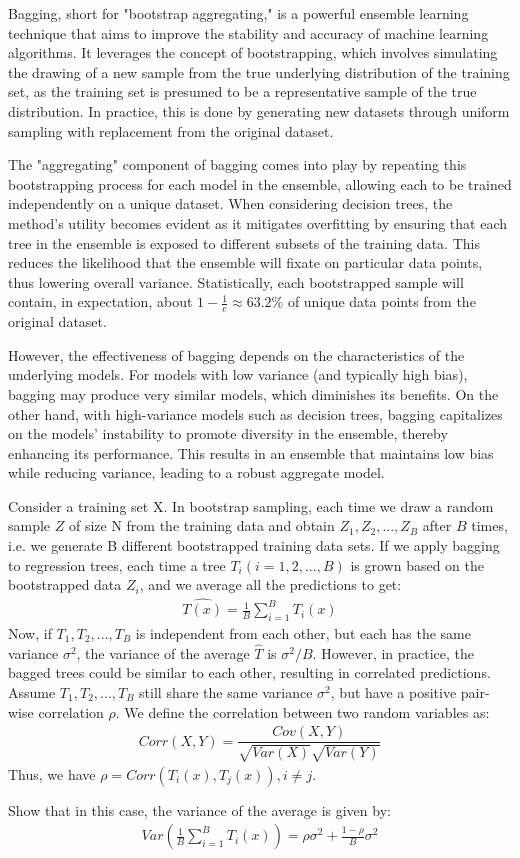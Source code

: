 \item {} 

Bagging, short for "bootstrap aggregating," is a powerful ensemble learning technique that aims to improve the stability and accuracy of machine learning algorithms. It leverages the concept of bootstrapping, which involves simulating the drawing of a new sample from the true underlying distribution of the training set, as the training set is presumed to be a representative sample of the true distribution. In practice, this is done by generating new datasets through uniform sampling with replacement from the original dataset.

The "aggregating" component of bagging comes into play by repeating this bootstrapping process for each model in the ensemble, allowing each to be trained independently on a unique dataset. When considering decision trees, the method's utility becomes evident as it mitigates overfitting by ensuring that each tree in the ensemble is exposed to different subsets of the training data. This reduces the likelihood that the ensemble will fixate on particular data points, thus lowering overall variance. Statistically, each bootstrapped sample will contain, in expectation, about $1 - \frac{1}{e} \approx 63.2\%$ of unique data points from the original dataset.

However, the effectiveness of bagging depends on the characteristics of the underlying models. For models with low variance (and typically high bias), bagging may produce very similar models, which diminishes its benefits. On the other hand, with high-variance models such as decision trees, bagging capitalizes on the models' instability to promote diversity in the ensemble, thereby enhancing its performance. This results in an ensemble that maintains low bias while reducing variance, leading to a robust aggregate model.

Consider a training set X. In bootstrap sampling, each time we draw a random sample $Z$ of size N from the training data and obtain ${Z_1, Z_2, ..., Z_B}$ after $B$ times, i.e. we generate B different bootstrapped training data sets. If we apply bagging to regression trees, each time a tree $T_i (i = 1,2,...,B)$ is grown based on the bootstrapped data $Z_i$, and we average all the predictions to get:
\begin{align*}
    \hat{T(x)} =  \frac{1}{B}\sum_{i=1}^{B} T_i(x)
\end{align*}
Now, if $T_1, T_2,..., T_B$ is independent from each other, but each has the same variance $\sigma^2$, the variance of the average $\hat{T}$ is $\sigma^2/B$. However, in practice, the bagged trees could be similar to each other, resulting in correlated predictions. Assume $T_1, T_2,..., T_B$ still share the same variance $\sigma^2$, but have a positive pair-wise correlation $\rho$. We define the correlation between two random variables as:\\
\begin{align*}
    Corr(X,Y)=\dfrac{Cov(X,Y)}{\sqrt{Var(X)}\sqrt{Var(Y)}}
\end{align*}
Thus, we have $\rho = Corr(T_i(x), T_j(x)), i \neq j$.

Show that in this case, the variance of the average is given by:
\begin{align*}
    Var(\frac{1}{B}\sum_{i=1}^{B} T_i(x)) = \rho \sigma^2 + \frac{1-\rho}{B} \sigma^2
\end{align*}